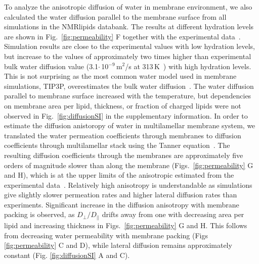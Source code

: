 \documentclass[fleqn,10pt]{wlscirep}
\begin{document}
To analyze the anisotropic diffusion of water in membrane environment, we also calculated the water diffusion parallel to the membrane surface from all simulations in the NMRlipids databank. The results at different hydration levels are shown in Fig.~\ref{fig:permeability} F together with the experimental data~\cite{rudakova04}. 
Simulation results are close to the experimental values with low hydration levels, but increase to the values of approximately two times higher than experimental bulk water diffusion value (3.1$\cdot$\,10$^{-9}$\,m$^2$/s at 313\,K~\cite{khakimov08}) with high hydration levels. This is not surprising as the most common water model used in membrane simulations, TIP3P, overestimates the bulk water diffusion~\cite{pathirannahalage21}. The water diffusion parallel to membrane surface increased with the temperature, but dependencies on membrane area per lipid, thickness, or fraction of charged lipids were not observed in Fig.~\ref{fig:diffusionSI} in the supplementary information. In order to estimate the diffusion anistoropy of water in multilamellar membrane system, we translated the water permeation coefficients through membranes to diffusion coefficients through multilamellar stack using the Tanner equation~\cite{tanner78,wasterby02}. The resulting diffusion coefficients through the membranes are approximately five orders of magnitude slower than along the membrane (Figs.~\ref{fig:permeability} G and H), which is at the upper limits of the anisotropic estimated from the experimental data~\cite{nitsche19}. Relatively high anisotropy is understandable as simulations give slightly slower permeation rates and higher lateral diffusion rates than experiments. Significant increase in the diffusion anisotropy with membrane packing is observed, as $D_{\perp}/D_{||}$ drifts away from one with decreasing area per lipid and increasing thickness in Figs.~\ref{fig:permeability} G and H. This follows from decreasing water permeability with membrane packing (Figs \ref{fig:permeability} C and D), while lateral diffusion remains approximately constant (Fig. \ref{fig:diffusionSI} A and C). 
\end{document}
